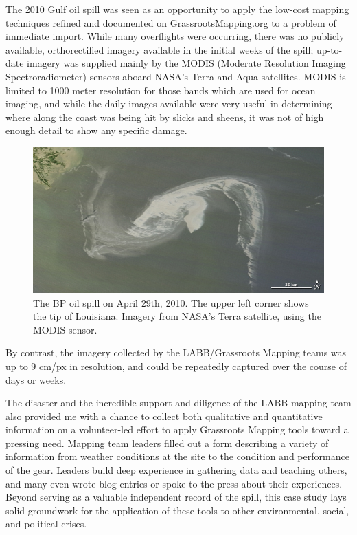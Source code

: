 \documentclass[11pt]{report}
\begin{document}

The 2010 Gulf oil spill was seen as an opportunity to apply the low-cost mapping techniques refined and documented on GrassrootsMapping.org to a problem of immediate import. While many overflights were occurring, there was no publicly available, orthorectified imagery available in the initial weeks of the spill; up-to-date imagery was supplied mainly by the MODIS (Moderate Resolution Imaging Spectroradiometer) sensors aboard NASA's Terra and Aqua satellites. MODIS is limited to 1000 meter resolution for those bands which are used for ocean imaging, and while the daily images available were very useful in determining where along the coast was being hit by slicks and sheens, it was not of high enough detail to show any specific damage. 

\begin{figure}[h]
  \begin{center}
	\includegraphics[width=1\textwidth]{images/nasa-modis-small.jpg}
	\caption{The BP oil spill on April 29th, 2010. The upper left corner shows the tip of Louisiana. Imagery from NASA's Terra satellite, using the MODIS sensor.}
  \end{center}
\end{figure}

By contrast, the imagery collected by the LABB/Grassroots Mapping teams was up to 9 cm/px in resolution, and could be repeatedly captured over the course of days or weeks.  

The disaster and the incredible support and diligence of the LABB mapping team also provided me with a chance to collect both qualitative and quantitative information on a volunteer-led effort to apply Grassroots Mapping tools toward a pressing need. Mapping team leaders filled out a form describing a variety of information from weather conditions at the site to the condition and performance of the gear. Leaders build deep experience in gathering data and teaching others, and many even wrote blog entries or spoke to the press about their experiences. Beyond serving as a valuable independent record of the spill, this case study lays solid groundwork for the application of these tools to other environmental, social, and political crises.
\end{document}
